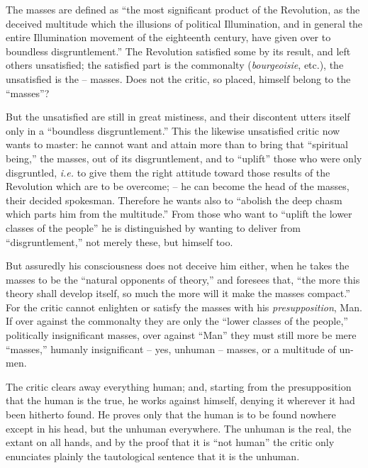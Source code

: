 The masses are defined as ``the most significant product of the Revolution, 
as the deceived multitude which the illusions of political Illumination, and 
in general the entire Illumination movement of the eighteenth century, have 
given over to boundless disgruntlement.'' The Revolution satisfied some by 
its result, and left others unsatisfied; the satisfied part is the commonalty 
(\textit{bourgeoisie}, etc.), the unsatisfied is the -- masses. Does not the 
critic, so placed, himself belong to the ``masses''?

But the unsatisfied are still in great mistiness, and their discontent utters 
itself only in a ``boundless disgruntlement.'' This the likewise unsatisfied 
critic now wants to master: he cannot want and attain more than to bring that 
``spiritual being,'' the masses, out of its disgruntlement, and to 
``uplift'' those who were only disgruntled, \textit{i.e.} to give them the 
right attitude toward those results of the Revolution which are to be 
overcome; -- he can become the head of the masses, their decided spokesman. 
Therefore he wants also to ``abolish the deep chasm which parts him from the 
multitude.'' From those who want to ``uplift the lower classes of the 
people'' he is distinguished by wanting to deliver from ``disgruntlement,'' 
not merely these, but himself too.

But assuredly his consciousness does not deceive him either, when he takes the 
masses to be the ``natural opponents of theory,'' and foresees that, ``the 
more this theory shall develop itself, so much the more will it make the 
masses compact.'' For the critic cannot enlighten or satisfy the masses with 
his \textit{presupposition}, Man. If over against the commonalty they are only 
the ``lower classes of the people,'' politically insignificant masses, over 
against ``Man'' they must still more be mere ``masses,'' humanly 
insignificant -- yes, unhuman -- masses, or a multitude of un-men.

The critic clears away everything human; and, starting from the presupposition 
that the human is the true, he works against himself, denying it wherever it 
had been hitherto found. He proves only that the human is to be found nowhere 
except in his head, but the unhuman everywhere. The unhuman is the real, the 
extant on all hands, and by the proof that it is ``not human'' the critic 
only enunciates plainly the tautological sentence that it is the unhuman.

